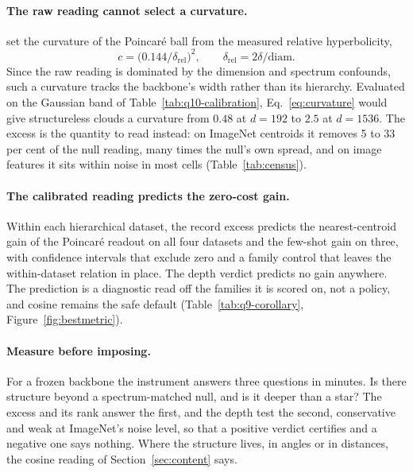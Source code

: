 \documentclass{article}
\theoremstyle{definition}
\begin{document}
\paragraph{The raw reading cannot select a curvature.} \citet{Khrulkov_2020_CVPR} set the curvature of the Poincar\'{e} ball from the measured relative hyperbolicity,
\begin{equation}
c=\big(0.144/\delta_{\text{rel}}\big)^{2},\qquad \delta_{\text{rel}}=2\delta/\mathrm{diam}.
\label{eq:curvature}
\end{equation}
Since the raw reading is dominated by the dimension and spectrum confounds, such a curvature tracks the backbone's width rather than its hierarchy. Evaluated on the Gaussian band of Table~\ref{tab:q10-calibration}, Eq.~\ref{eq:curvature} would give structureless clouds a curvature from $0.48$ at $d{=}192$ to $2.5$ at $d{=}1536$. The excess is the quantity to read instead: on ImageNet centroids it removes 5 to 33 per cent of the null reading, many times the null's own spread, and on image features it sits within noise in most cells (Table~\ref{tab:census}). %

\paragraph{The calibrated reading predicts the zero-cost gain.} Within each hierarchical dataset, the record excess predicts the nearest-centroid gain of the Poincar\'{e} readout on all four datasets and the few-shot gain on three, with confidence intervals that exclude zero and a family control that leaves the within-dataset relation in place. The depth verdict predicts no gain anywhere. The prediction is a diagnostic read off the families it is scored on, not a policy, and cosine remains the safe default (Table~\ref{tab:q9-corollary}, Figure~\ref{fig:bestmetric}). %

\paragraph{Measure before imposing.} For a frozen backbone the instrument answers three questions in minutes. Is there structure beyond a spectrum-matched null, and is it deeper than a star? The excess and its rank answer the first, and the depth test the second, conservative and weak at ImageNet's noise level, so that a positive verdict certifies and a negative one says nothing. Where the structure lives, in angles or in distances, the cosine reading of Section~\ref{sec:content} says.
\end{document}
